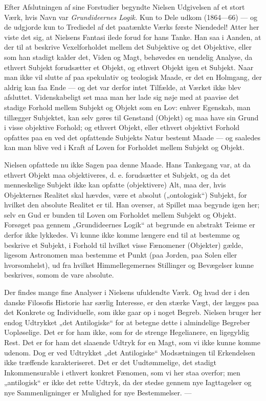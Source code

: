 \documentclass[12pt,a4paper,openany]{book}
\newcommand{\opage}[1]{\marginnote{\footnotesize\textit{[#1]}}}
\begin{document}
Efter Afslutningen af sine Forstudier begyndte Nielsen Udgivelsen af et stort
Værk, hvis Navn var \textit{Grundideernes Logik.} Kun to Dele udkom (1864---66)
--- og de udgjorde kun to Trediedel af det paatænkte Værks første Niendedel!
Atter her viste det sig, at Nielsens Fantasi ilede forud for hans Tanke. Han
saa i Aanden, at der til at beskrive Vexelforholdet mellem det Subjektive og
det Objektive, eller som han stadigt kalder det, Viden og Magt, behøvedes en
uendelig Analyse, da ethvert Subjekt forudsætter et Objekt, og ethvert Objekt
igen et Subjekt. Naar man ikke vil slutte af paa spekulativ og teologisk Maade,
er det en Holmgang, der aldrig kan faa Ende --- og det var derfor intet
Tilfælde, at Værket ikke blev afsluttet. Videnskabeligt set maa man her lade
sig nøje med at paavise det stadige Forhold mellem Subjekt og Objekt som en
Lov: enhver Egenskab, man tillægger Subjektet, kan selv gøres til Genstand
(Objekt) og maa have sin
\setcounter{footnote}{0}%
\opage{190}Grund i visse objektive Forhold; og ethvert Objekt, eller ethvert
objektivt Forhold opfattes paa en ved det opfattende Subjekts Natur bestemt
Maade --- og saaledes kan man blive ved i Kraft af Loven for Forholdet mellem
Subjekt og Objekt.

Nielsen opfattede nu ikke Sagen paa denne Maade. Hans Tankegang var, at da
ethvert Objekt maa objektiveres, d. e. forudsætter et Subjekt, og da det
menneskelige Subjekt ikke kan opfatte (objektivere) Alt, maa der, hvis
Objekternes Realitet skal hævdes, være et absolut („ontologisk“) Subjekt, for
hvilket den absolute Realitet er til. Han overser, at Spillet maa begynde igen
her; selv en Gud er bunden til Loven om Forholdet mellem Subjekt og Objekt.
Forsøget paa gennem „Grundideernes Logik“ at begrunde en abstrakt Teisme er
derfor ikke lykkedes. Vi kunne ikke komme længere end til at bestemme og
beskrive et Subjekt, i Forhold til hvilket visse Fænomener (Objekter) gælde,
ligesom Astronomen maa bestemme et Punkt (paa Jorden, paa Solen eller
hvorsomhelst), ud fra hvilket Himmellegemernes Stillinger og Bevægelser kunne
beskrives, somom de vare absolute.

Der findes mange fine Analyser i Nielsens ufuldendte Værk. Og hvad der i den
danske Filosofis Historie har særlig Interesse, er den stærke Vægt, der lægges
paa det Konkrete og Individuelle, som ikke gaar op i noget Begreb. Nielsen
bruger her endog Udtrykket „det Antilogiske“ for at betegne dette i almindelige
Begreber Uopløselige. Det er for ham ikke, som for de strenge Hegelianere, en
ligegyldig Rest. Det er for ham det slaaende Udtryk for en Magt, som vi ikke
kunne komme udenom. Dog er ved Udtrykket „det Antilogiske“ Modsætningen til
Erkendelsen ikke træffende karakteriseret. Det er det Uudtømmelige, det stadigt
Inkommensurable i ethvert konkret Fænomen, som vi her staa overfor; men
„antilogisk“ er ikke det rette Udtryk, da der stedse gennem nye Iagttagelser og
nye Sammenligninger er Mulighed for nye Bestemmelser. ---
\end{document}
